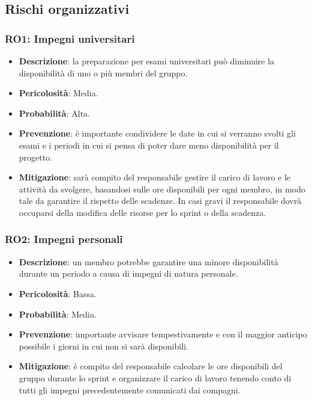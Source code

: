 \subsection{Rischi organizzativi}

\subsubsection{RO1: Impegni universitari}
\begin{itemize}
    \item \textbf{Descrizione}: la preparazione per esami universitari può diminuire la disponibilità di uno o più membri del gruppo.
    \item \textbf{Pericolosità}: Media.
    \item \textbf{Probabilità}: Alta.
    \item \textbf{Prevenzione}: è importante condividere le date in cui si verranno svolti gli esami e i periodi in cui si pensa di poter dare meno disponibilità per il progetto.
    \item \textbf{Mitigazione}: sarà compito del responsabile gestire il carico di lavoro e le attività da svolgere, basandosi sulle ore disponibili per ogni membro, in modo tale da garantire il rispetto delle scadenze. 
    In casi gravi il responsabile dovrà occuparsi della modifica delle risorse per lo sprint o della scadenza.
\end{itemize}

\subsubsection{RO2: Impegni personali}
\begin{itemize}
    \item \textbf{Descrizione}: un membro potrebbe garantire una minore disponibilità durante un periodo a causa di impegni di natura personale.
    \item \textbf{Pericolosità}: Bassa.
    \item \textbf{Probabilità}: Media.
    \item \textbf{Prevenzione}: importante avvisare tempestivamente e con il maggior anticipo possibile i giorni in cui non si sarà disponibili. 
    \item \textbf{Mitigazione}: è compito del responsabile calcolare le ore disponibili del gruppo durante lo sprint e organizzare il carico di lavoro tenendo conto di tutti gli impegni precedentemente comunicati dai compagni. 
\end{itemize}

